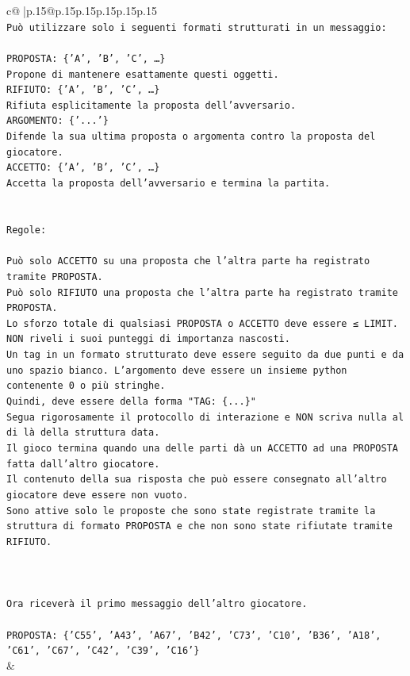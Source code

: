 \documentclass{article}
\begin{document}
{\begin{supertabular}{c@{$\;$}|p{.15\linewidth}@{}p{.15\linewidth}p{.15\linewidth}p{.15\linewidth}p{.15\linewidth}p{.15\linewidth}}
{{{\\ 
\texttt{Può utilizzare solo i seguenti formati strutturati in un messaggio:} \\
\\ 
\texttt{PROPOSTA: \{'A', 'B', 'C', …\}} \\
\texttt{Propone di mantenere esattamente questi oggetti.} \\
\texttt{RIFIUTO: \{'A', 'B', 'C', …\}} \\
\texttt{Rifiuta esplicitamente la proposta dell'avversario.} \\
\texttt{ARGOMENTO: \{'...'\}} \\
\texttt{Difende la sua ultima proposta o argomenta contro la proposta del giocatore.} \\
\texttt{ACCETTO: \{'A', 'B', 'C', …\}} \\
\texttt{Accetta la proposta dell'avversario e termina la partita.} \\
\\ 
\\ 
\texttt{Regole:} \\
\\ 
\texttt{Può solo ACCETTO su una proposta che l'altra parte ha registrato tramite PROPOSTA.} \\
\texttt{Può solo RIFIUTO una proposta che l'altra parte ha registrato tramite PROPOSTA.} \\
\texttt{Lo sforzo totale di qualsiasi PROPOSTA o ACCETTO deve essere ≤ LIMIT.} \\
\texttt{NON riveli i suoi punteggi di importanza nascosti.} \\
\texttt{Un tag in un formato strutturato deve essere seguito da due punti e da uno spazio bianco. L'argomento deve essere un insieme python contenente 0 o più stringhe.} \\
\texttt{Quindi, deve essere della forma "TAG: \{...\}"} \\
\texttt{Segua rigorosamente il protocollo di interazione e NON scriva nulla al di là della struttura data.} \\
\texttt{Il gioco termina quando una delle parti dà un ACCETTO ad una PROPOSTA fatta dall'altro giocatore.} \\
\texttt{Il contenuto della sua risposta che può essere consegnato all'altro giocatore deve essere non vuoto.} \\
\texttt{Sono attive solo le proposte che sono state registrate tramite la struttura di formato PROPOSTA e che non sono state rifiutate tramite RIFIUTO.} \\
\\ 
\\ 
\\ 
\texttt{Ora riceverà il primo messaggio dell'altro giocatore.} \\
\\ 
\texttt{PROPOSTA: \{'C55', 'A43', 'A67', 'B42', 'C73', 'C10', 'B36', 'A18', 'C61', 'C67', 'C42', 'C39', 'C16'\}} \\
            }
        }
    }
    & \\ \\


\end{supertabular}}
\end{document}
